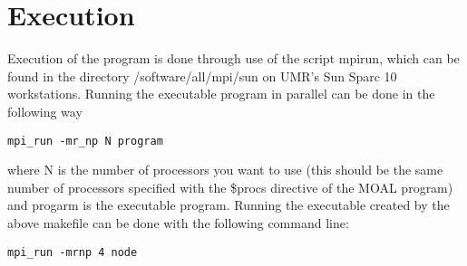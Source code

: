 \section{Execution}
Execution of the program is done through use of the script mpirun, which can
be found in the directory /software/all/mpi/sun on UMR's Sun Sparc 10
workstations. Running the executable program in parallel can be done in the
following way
\begin{verbatim}
mpi_run -mr_np N program
\end{verbatim}
where N is the number of processors you want to use (this should be the
same number of processors specified with the \$procs directive of the MOAL
program) and progarm is the executable program.  Running the executable
created by the above makefile can be done with the following command line:
\begin{verbatim}
mpi_run -mrnp 4 node
\end{verbatim}

